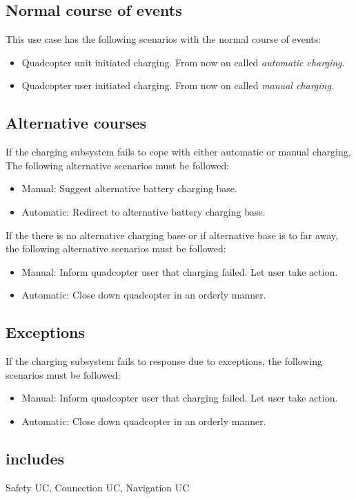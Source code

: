 \documentclass[a4paper]{article}
\begin{document}
\subsection{Normal course of events}
This use case has the following scenarios with the normal course of events:
\begin{itemize}
	\item Quadcopter unit initiated charging. From now on called \textit{automatic charging}.
	\item Quadcopter user initiated charging. From now on called \textit{manual charging}.
\end{itemize}
\subsection{Alternative courses}
If the charging subsystem fails to cope with either automatic or manual charging,
The following alternative scenarios must be followed:
\begin{itemize}
	\item Manual: Suggest alternative battery charging base.
	\item Automatic: Redirect to alternative battery charging base.
\end{itemize}
If the there is no alternative charging base or if alternative base is to far away,
the following alternative scenarios must be followed:
\begin{itemize}
	\item Manual: Inform quadcopter user that charging failed. Let user take action.
	\item Automatic: Close down quadcopter in an orderly manner.
\end{itemize}
\subsection{Exceptions}
If the charging subsystem fails to response due to exceptions, the following scenarios must be followed:
\begin{itemize}
	\item Manual: Inform quadcopter user that charging failed. Let user take action.
	\item Automatic: Close down quadcopter in an orderly manner.
\end{itemize}
\subsection{includes}
Safety UC, Connection UC, Navigation UC
\end{document}
